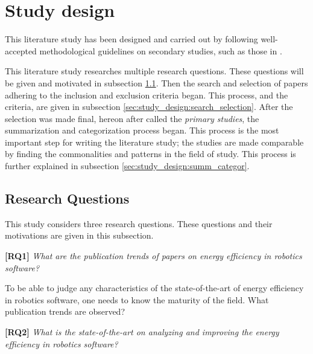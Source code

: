 \section{Study design}
\label{sec:study_design}
This literature study has been designed and carried out by following 
well-accepted methodological guidelines on secondary studies, such as those in 
\cite{petersen2015guidelines_systematic, kitchenham2013systematic_review_guidelines, wohlin2012experimentation}.

This literature study researches multiple research questions. 
These questions will be given and motivated in subsection \ref{sec:study_design:research_questions}.
Then the search and selection of papers adhering to the inclusion and exclusion criteria began.
This process, and the criteria, are given in subsection \ref{sec:study_design:search_selection}.
After the selection was made final, hereon after called the \textit{primary studies}, the summarization and categorization process began. 
This process is the most important step for writing the literature study; the studies are made comparable by finding the commonalities and patterns in the field of study. 
This process is further explained in subsection \ref{sec:study_design:summ_categor}.


\subsection{Research Questions}
\label{sec:study_design:research_questions}
This study considers three research questions. These questions and their motivations are given in this subsection.

\vspace{5mm}

\textbf{[RQ1]} \textit{What are the publication trends of papers on energy efficiency in robotics software?}

\vspace{5mm}

To be able to judge any characteristics of the state-of-the-art of energy efficiency in robotics software, one needs to know the maturity of the field.
What publication trends are observed?

\vspace{5mm}

\textbf{[RQ2]} \textit{What is the state-of-the-art on analyzing and improving the energy efficiency in robotics software?}

\vspace{5mm}

